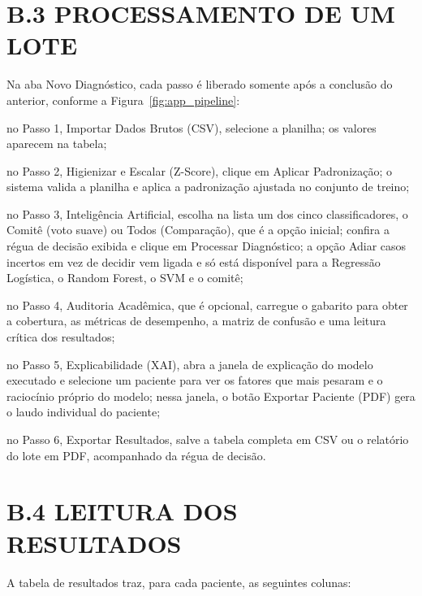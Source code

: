 \section*{B.3 PROCESSAMENTO DE UM LOTE}

Na aba Novo Diagnóstico, cada passo é liberado somente após a conclusão do
anterior, conforme a Figura~\ref{fig:app_pipeline}:

\begin{alineas}
    \item no Passo 1, Importar Dados Brutos (CSV), selecione a planilha; os
          valores aparecem na tabela;
    \item no Passo 2, Higienizar e Escalar (Z-Score), clique em Aplicar
          Padronização; o sistema valida a planilha e aplica a padronização
          ajustada no conjunto de treino;
    \item no Passo 3, Inteligência Artificial, escolha na lista um dos cinco
          classificadores, o Comitê (voto suave) ou Todos (Comparação), que é a
          opção inicial; confira a régua de decisão exibida e clique em
          Processar Diagnóstico; a opção Adiar casos incertos em vez de decidir
          vem ligada e só está disponível para a Regressão Logística, o Random
          Forest, o SVM e o comitê;
    \item no Passo 4, Auditoria Acadêmica, que é opcional, carregue o gabarito
          para obter a cobertura, as métricas de desempenho, a matriz de
          confusão e uma leitura crítica dos resultados;
    \item no Passo 5, Explicabilidade (XAI), abra a janela de explicação do
          modelo executado e selecione um paciente para ver os fatores que mais
          pesaram e o raciocínio próprio do modelo; nessa janela, o botão
          Exportar Paciente (PDF) gera o laudo individual do paciente;
    \item no Passo 6, Exportar Resultados, salve a tabela completa em CSV ou o
          relatório do lote em PDF, acompanhado da régua de decisão.
\end{alineas}

\section*{B.4 LEITURA DOS RESULTADOS}

A tabela de resultados traz, para cada paciente, as seguintes colunas:

